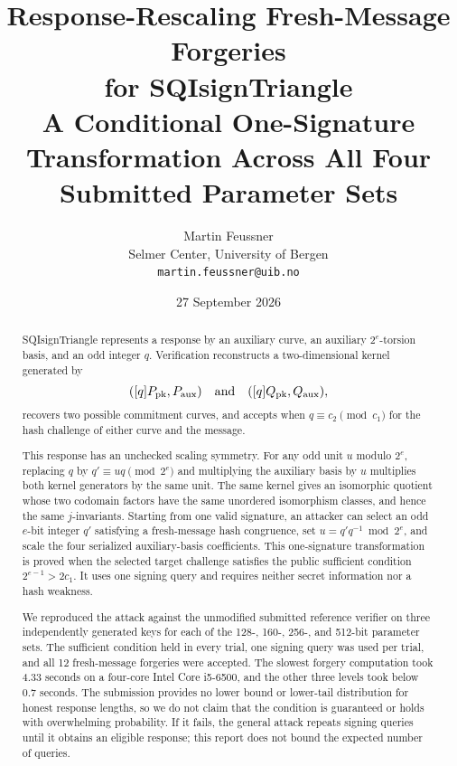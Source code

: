 \documentclass[11pt,a4paper]{article}
\title{\bfseries Response-Rescaling Fresh-Message Forgeries\\
for SQIsignTriangle\\[0.3em]
\large A Conditional One-Signature Transformation Across All Four Submitted
Parameter Sets}
\author{Martin Feussner\\
\small Selmer Center, University of Bergen\\
\small \texttt{martin.feussner@uib.no}}
\date{27 September 2026}
\begin{document}
\maketitle

\begin{center}
\end{center}
\vspace{0.7em}

\begin{abstract}
SQIsignTriangle represents a response by an auxiliary curve, an auxiliary
$2^e$-torsion basis, and an odd integer $q$. Verification reconstructs a
two-dimensional kernel generated by
\[
  ([q]P_{\rm pk},P_{\rm aux})
  \quad\text{and}\quad
  ([q]Q_{\rm pk},Q_{\rm aux}),
\]
recovers two possible commitment curves, and accepts when $q\equiv c_2
\pmod{c_1}$ for the hash challenge of either curve and the message.

This response has an unchecked scaling symmetry. For any odd unit $u$ modulo
$2^e$, replacing $q$ by $q'\equiv uq\pmod{2^e}$ and multiplying the auxiliary
basis by $u$ multiplies both kernel generators by the same unit. The same
kernel gives an isomorphic quotient whose two codomain factors have the same
unordered isomorphism classes, and hence the same $j$-invariants. Starting
from one valid signature, an attacker can select an odd $e$-bit integer $q'$
satisfying a fresh-message hash congruence, set
$u=q'q^{-1}\bmod 2^e$, and scale the four serialized auxiliary-basis
coefficients. This one-signature transformation is proved when the selected
target challenge satisfies the public sufficient condition
$2^{e-1}>2c_1$. It uses one signing query and requires neither secret
information nor a hash weakness.

We reproduced the attack against the unmodified submitted reference verifier
on three independently generated keys for each of the 128-, 160-, 256-, and
512-bit parameter sets. The sufficient condition held in every trial, one
signing query was used per trial, and all 12 fresh-message forgeries were
accepted. The slowest forgery computation took 4.33 seconds on a four-core
Intel Core i5-6500, and the other three levels took below 0.7 seconds. The
submission provides no lower bound or lower-tail distribution for honest
response lengths, so we do not claim that the condition is guaranteed or
holds with overwhelming probability. If it fails, the general attack repeats
signing queries until it obtains an eligible response; this report does not
bound the expected number of queries.
\end{abstract}
\end{document}
